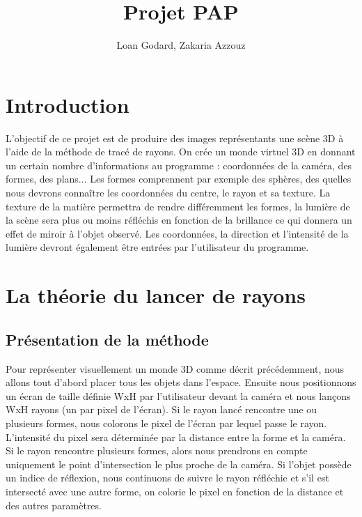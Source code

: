 \documentclass[11pt, oneside]{article}   	%
\title{Projet PAP}
\author{Loan Godard, Zakaria Azzouz}
\begin{document}
\maketitle
\section{Introduction}

L'objectif de ce projet est de produire des images représentants une scène 3D à l'aide de la méthode de tracé de rayons. On crée un monde virtuel 3D en donnant un certain nombre d'informations au programme : coordonnées de la caméra, des formes, des plans... Les formes comprennent par exemple des sphères, des quelles nous devrons connaître les coordonnées du centre, le rayon et sa texture. La texture de la matière permettra de rendre différemment les formes, la lumière de la scène sera plus ou moins réfléchis en fonction de la brillance ce qui donnera un effet de miroir à l'objet observé. Les coordonnées, la direction et l'intensité de la lumière devront également être entrées par l'utilisateur du programme.

\section{La théorie du lancer de rayons}
\subsection{Présentation de la méthode}
Pour représenter visuellement un monde 3D comme décrit précédemment, nous allons tout d'abord placer tous les objets dans l'espace. Ensuite nous positionnons un écran de taille définie WxH par l'utilisateur devant la caméra et nous lan\c cons WxH rayons (un par pixel de l'écran). Si le rayon lancé rencontre une ou plusieurs formes, nous colorons le pixel de l'écran par lequel passe le rayon. L'intensité du pixel sera déterminée par la distance entre la forme et la caméra. Si le rayon rencontre plusieurs formes, alors nous prendrons en compte uniquement le point d'intersection le plus proche de la caméra. Si l'objet possède un indice de réflexion, nous continuons de suivre le rayon réfléchie et s'il est intersecté avec une autre forme, on colorie le pixel en fonction de la distance et des autres paramètres.
\end{document}
